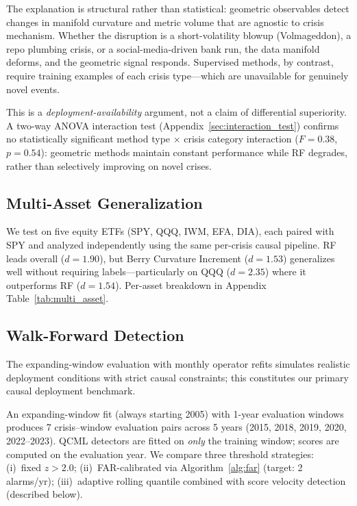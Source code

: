 \documentclass[3p]{elsarticle}
\begin{document}
The explanation is structural rather than statistical: geometric
observables detect changes in manifold curvature and metric volume
that are agnostic to crisis mechanism.  Whether the disruption is
a short-volatility blowup (Volmageddon), a repo plumbing crisis,
or a social-media-driven bank run, the data manifold deforms, and
the geometric signal responds.  Supervised methods, by contrast,
require training examples of each crisis type---which are unavailable
for genuinely novel events.

This is a \emph{deployment-availability} argument, not a claim
of differential superiority.  A two-way ANOVA interaction test
(Appendix~\ref{sec:interaction_test}) confirms no statistically
significant method type $\times$ crisis category interaction
($F = 0.38$, $p = 0.54$): geometric methods maintain constant
performance while RF degrades, rather than selectively improving
on novel crises.

\subsection{Multi-Asset Generalization}\label{subsec:multi_asset}

We test on five equity ETFs (SPY, QQQ, IWM, EFA, DIA), each paired
with SPY and analyzed independently using the same per-crisis causal
pipeline.  RF leads overall ($d = 1.90$), but Berry Curvature
Increment ($d = 1.53$) generalizes well without requiring
labels---particularly on QQQ ($d = 2.35$) where it outperforms RF
($d = 1.54$).  Per-asset breakdown in Appendix
Table~\ref{tab:multi_asset}.

\subsection{Walk-Forward Detection}\label{subsec:walkforward}

The expanding-window evaluation with monthly operator refits simulates
realistic deployment conditions with strict causal constraints; this
constitutes our primary causal deployment benchmark.

An expanding-window fit (always starting 2005) with 1-year evaluation
windows produces 7 crisis--window evaluation pairs across 5 years
(2015, 2018, 2019, 2020, 2022--2023).  QCML detectors are fitted on
\emph{only} the training window; scores are computed on the evaluation
year.  We compare three threshold strategies:
(i)~fixed $z > 2.0$;
(ii)~FAR-calibrated via Algorithm~\ref{alg:far} (target: 2 alarms/yr);
(iii)~adaptive rolling quantile combined with score velocity detection
(described below).
\end{document}
